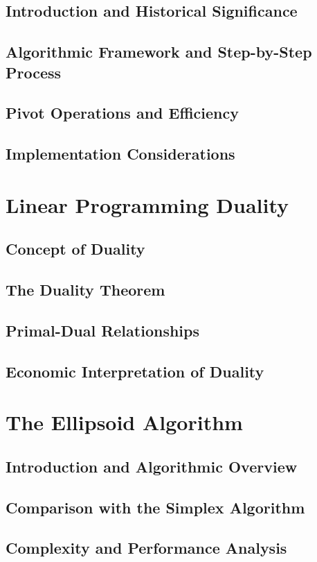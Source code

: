 \documentclass[12pt]{book} %
\begin{document}
\subsection{Introduction and Historical Significance}
\subsection{Algorithmic Framework and Step-by-Step Process}
\subsection{Pivot Operations and Efficiency}
\subsection{Implementation Considerations}

\section{Linear Programming Duality}
\subsection{Concept of Duality}
\subsection{The Duality Theorem}
\subsection{Primal-Dual Relationships}
\subsection{Economic Interpretation of Duality}

\section{The Ellipsoid Algorithm}
\subsection{Introduction and Algorithmic Overview}
\subsection{Comparison with the Simplex Algorithm}
\subsection{Complexity and Performance Analysis}
\end{document}

